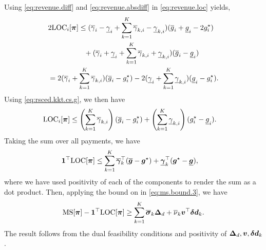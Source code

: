 Using \eqref{eq:revenue.diff} and \eqref{eq:revenue.absdiff} in \eqref{eq:revenue.loc} yields,
{\small \begin{equation*}
\begin{aligned}
   &2 {\rm LOC}_i[{\bm{\pi}}] \le (\overline{\gamma}_i - \underline{\gamma}_i + \sum_{k = 1}^K \overline{\gamma}_{k,i} - \underline{\gamma}_{k,i})(\overline{g}_i + \underline{g}_i - 2 g_i^\star) \\
   &\qquad\qquad\quad + (\overline{\gamma}_i + \underline{\gamma}_i + \sum_{k = 1}^K \overline{\gamma}_{k,i} + \underline{\gamma}_{k,i})(\overline{g}_i - \underline{g}_i) \\
   &= 2 (\overline{\gamma}_i + \sum_{k = 1}^K \overline{\gamma}_{k,i}) (\overline{g}_i - g_i^\star) - 2 (\underline{\gamma}_i + \sum_{k = 1}^K \underline{\gamma}_{k,i})(\underline{g}_i - g_i^\star).
\end{aligned}
\end{equation*}}
Using \eqref{eq:rsced.kkt.cs.g}, we then have
{\small \begin{equation}\nonumber 
\begin{aligned}
  {\rm LOC}_i[{\bm{\pi}}] &\le \left( \sum_{k = 1}^K \overline{\gamma}_{k,i} \right) (\overline{g}_i - g_i^\star) + \left( \sum_{k = 1}^K \underline{\gamma}_{k,i} \right)(g_i^\star - \underline{g}_i).
\end{aligned}
\end{equation}}
Taking the sum over all payments, we have
{\small \begin{equation}\nonumber 
\begin{aligned}
    \mathbf{1}^\top {\rm LOC}[{\bm{\pi}}] &\le \sum_{k = 1}^K \overline{{\bm{\gamma}}}_k^\top (\overline{{\bm{g}}} - {\bm{g}}^\star) + \underline{{\bm{\gamma}}}_k^\top ({\bm{g}}^\star - \underline{{\bm{g}}}),
\end{aligned}
\end{equation}}
where we have used positivity of each of the components to render the sum as a dot product. Then, applying the bound on \MS{} in \eqref{eq:ms.bound.3}, we have
{\small \begin{equation}\nonumber
\begin{aligned}
  {\rm MS}[{\bm{\pi}}] - \mathbf{1}^\top {\rm LOC}{}[{\bm{\pi}}] \ge \sum_{k = 1}^K \overline{{\bm{\sigma}}}_k {\bm{\Delta}}_d + \overline{\nu}_k {{\bm{v}}}^\top {\bm{\delta d}}_k.
\end{aligned}
\end{equation}}
The result follows from the dual feasibility conditions and positivity of ${\bm{\Delta}}_d, {{\bm{v}}}, {\bm{\delta d}}_k$.




